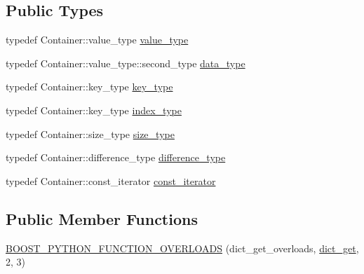 \subsection*{\-Public \-Types}
\begin{DoxyCompactItemize}
\item 
typedef \-Container\-::value\-\_\-type \hyperlink{classboost_1_1python_1_1std__map__indexing__suite_aff9ed68cf30e805a04a313d92c62ab38}{value\-\_\-type}
\item 
typedef \*
\-Container\-::value\-\_\-type\-::second\-\_\-type \hyperlink{classboost_1_1python_1_1std__map__indexing__suite_a3e9a6a8b8ba34759cf0ba99fe5966041}{data\-\_\-type}
\item 
typedef \-Container\-::key\-\_\-type \hyperlink{classboost_1_1python_1_1std__map__indexing__suite_a4e2daeb60a58d6ce9964e0ea27680009}{key\-\_\-type}
\item 
typedef \-Container\-::key\-\_\-type \hyperlink{classboost_1_1python_1_1std__map__indexing__suite_a4b2ac75883fba93dbca6d9e83197c842}{index\-\_\-type}
\item 
typedef \-Container\-::size\-\_\-type \hyperlink{classboost_1_1python_1_1std__map__indexing__suite_ad1c24ad53b2e27b061f75591c74296c2}{size\-\_\-type}
\item 
typedef \-Container\-::difference\-\_\-type \hyperlink{classboost_1_1python_1_1std__map__indexing__suite_a54aa644dcb3913334f8b0152901940ef}{difference\-\_\-type}
\item 
typedef \-Container\-::const\-\_\-iterator \hyperlink{classboost_1_1python_1_1std__map__indexing__suite_aae0c4473455223a4e048cc207ca7b3ea}{const\-\_\-iterator}
\end{DoxyCompactItemize}
\subsection*{\-Public \-Member \-Functions}
\begin{DoxyCompactItemize}
\item 
\hyperlink{classboost_1_1python_1_1std__map__indexing__suite_aeea6d865c496b7145baa50301a4b5702}{\-B\-O\-O\-S\-T\-\_\-\-P\-Y\-T\-H\-O\-N\-\_\-\-F\-U\-N\-C\-T\-I\-O\-N\-\_\-\-O\-V\-E\-R\-L\-O\-A\-D\-S} (dict\-\_\-get\-\_\-overloads, \hyperlink{classboost_1_1python_1_1std__map__indexing__suite_a6012daef85763e30ed55ef753933ff1b}{dict\-\_\-get}, 2, 3)
\end{DoxyCompactItemize}
